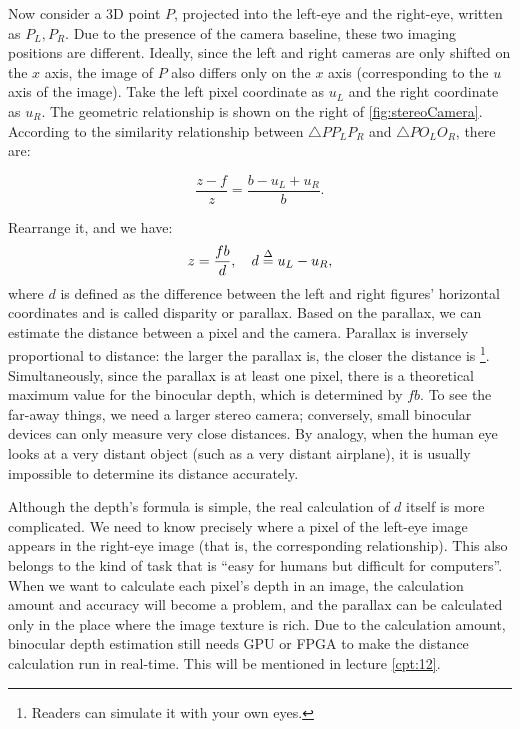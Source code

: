 Now consider a 3D point $P$, projected into the left-eye and the right-eye, written as $P_L, P_R$. Due to the presence of the camera baseline, these two imaging positions are different. Ideally, since the left and right cameras are only shifted on the $x$ axis, the image of $P$ also differs only on the $x$ axis (corresponding to the $u$ axis of the image). Take the left pixel coordinate as $u_L$ and the right coordinate as $u_R$. The geometric relationship is shown on the right of \autoref{fig:stereoCamera}. According to the similarity relationship between $ \triangle P P_L P_R$ and $\triangle P O_L O_R$, there are:

\begin{equation}
\frac{{z - f}}{z} = \frac{{b - {u_L} + {u_R}}}{b}.
\end{equation}

Rearrange it, and we have:
\begin{equation}
z = \frac{{fb}}{d}, \quad d \buildrel \Delta \over = {u_L} - {u_R},
\end{equation}
where $d$ is defined as the difference between the left and right figures' horizontal coordinates and is called disparity or parallax. Based on the parallax, we can estimate the distance between a pixel and the camera. Parallax is inversely proportional to distance: the larger the parallax is, the closer the distance is \footnote {Readers can simulate it with your own eyes.}. Simultaneously, since the parallax is at least one pixel, there is a theoretical maximum value for the binocular depth, which is determined by $fb$. To see the far-away things, we need a larger stereo camera; conversely, small binocular devices can only measure very close distances. By analogy, when the human eye looks at a very distant object (such as a very distant airplane), it is usually impossible to determine its distance accurately.

Although the depth's formula is simple, the real calculation of $d$ itself is more complicated. We need to know precisely where a pixel of the left-eye image appears in the right-eye image (that is, the corresponding relationship). This also belongs to the kind of task that is ``easy for humans but difficult for computers''. When we want to calculate each pixel's depth in an image, the calculation amount and accuracy will become a problem, and the parallax can be calculated only in the place where the image texture is rich. Due to the calculation amount, binocular depth estimation still needs GPU or FPGA to make the distance calculation run in real-time. This will be mentioned in lecture \ref{cpt:12}.

